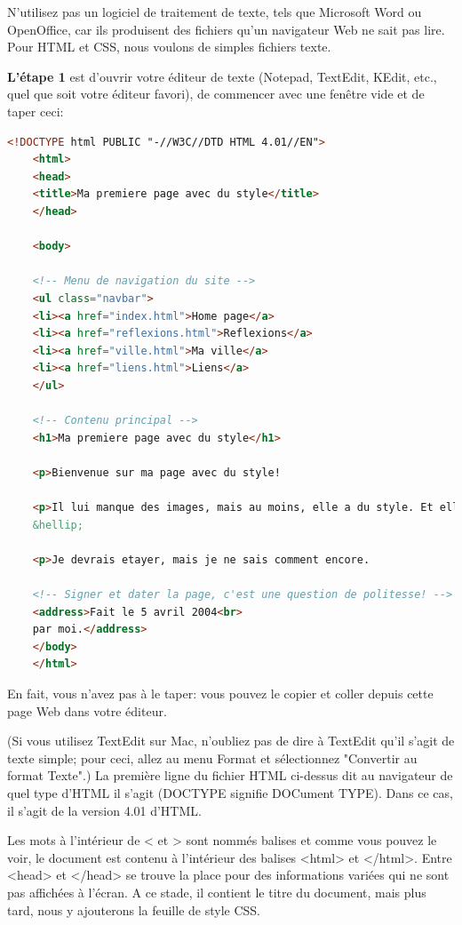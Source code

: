 N'utilisez pas un logiciel de traitement de texte, tels que Microsoft Word ou OpenOffice, car ils produisent des fichiers qu'un navigateur Web ne sait pas lire. Pour HTML et CSS, nous voulons de simples fichiers texte.

\textbf{L'étape 1} est d'ouvrir votre éditeur de texte (Notepad, TextEdit, KEdit, etc., quel que soit votre éditeur favori), de commencer avec une fenêtre vide et de taper ceci:
\begin{lstlisting}[language=html]
	<!DOCTYPE html PUBLIC "-//W3C//DTD HTML 4.01//EN">
	<html>
	<head>
	<title>Ma premiere page avec du style</title>
	</head>
	
	<body>
	
	<!-- Menu de navigation du site -->
	<ul class="navbar">
	<li><a href="index.html">Home page</a>
	<li><a href="reflexions.html">Reflexions</a>
	<li><a href="ville.html">Ma ville</a>
	<li><a href="liens.html">Liens</a>
	</ul>
	
	<!-- Contenu principal -->
	<h1>Ma premiere page avec du style</h1>
	
	<p>Bienvenue sur ma page avec du style! 
	
	<p>Il lui manque des images, mais au moins, elle a du style. Et elle a des liens, meme s'ils ne menent nulle part...
	&hellip;
	
	<p>Je devrais etayer, mais je ne sais comment encore.
	
	<!-- Signer et dater la page, c'est une question de politesse! -->
	<address>Fait le 5 avril 2004<br>
	par moi.</address>
	</body>
	</html>
\end{lstlisting}
En fait, vous n'avez pas à le taper: vous pouvez le copier et coller depuis cette page Web dans votre éditeur.

(Si vous utilisez TextEdit sur Mac, n'oubliez pas de dire à TextEdit qu'il s'agit de texte simple; pour ceci, allez au menu Format et sélectionnez "Convertir au format Texte".) 
 La première ligne du fichier HTML ci-dessus dit au navigateur de quel type d'HTML il s'agit (DOCTYPE signifie DOCument TYPE). Dans ce cas, il s'agit de la version 4.01 d'HTML.
 
 Les mots à l'intérieur de < et > sont nommés balises et comme vous pouvez le voir, le document est contenu à l'intérieur des balises <html> et </html>. Entre <head> et </head> se trouve la place pour des informations variées qui ne sont pas affichées à l'écran. A ce stade, il contient le titre du document, mais plus tard, nous y ajouterons la feuille de style CSS.
 
